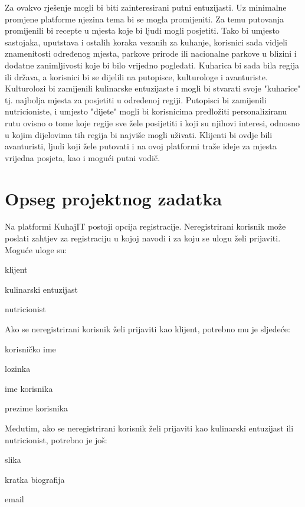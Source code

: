 		Za ovakvo rješenje mogli bi biti zainteresirani putni entuzijasti. Uz minimalne promjene platforme njezina tema bi se mogla promijeniti. Za temu putovanja promijenili bi recepte u mjesta koje bi ljudi mogli posjetiti. Tako bi umjesto sastojaka, uputstava i ostalih koraka vezanih za kuhanje, korisnici sada vidjeli znamenitosti određenog mjesta, parkove prirode ili nacionalne parkove u blizini i dodatne zanimljivosti koje bi bilo vrijedno pogledati. Kuharica bi sada bila regija ili država, a korisnici bi se dijelili na putopisce, kulturologe i avanturiste. Kulturolozi bi zamijenili kulinarske entuzijaste i mogli bi stvarati svoje "kuharice" tj. najbolja mjesta za posjetiti u određenoj regiji. Putopisci bi zamijenili nutricioniste, i umjesto "dijete" mogli bi korisnicima predložiti personaliziranu rutu ovisno o tome koje regije sve žele posijetiti i koji su njihovi interesi, odnosno u kojim dijelovima tih regija bi najviše mogli uživati. Klijenti bi ovdje bili avanturisti, ljudi koji žele putovati i na ovoj platformi traže ideje za mjesta vrijedna posjeta, kao i mogući putni vodič.
		
		\section{Opseg projektnog zadatka}
		Na platformi KuhajIT postoji opcija registracije.
		Neregistrirani korisnik može poslati zahtjev za registraciju u kojoj navodi i za koju se ulogu želi prijaviti. Moguće uloge su:
		\begin{packed_item}
		    \item klijent
		    \item kulinarski entuzijast
		    \item nutricionist
		\end{packed_item}
		
		Ako se neregistrirani korisnik želi prijaviti kao klijent, potrebno mu je sljedeće:
		\begin{packed_item}
			\item korisničko ime
			\item lozinka
			\item ime korisnika
			\item prezime korisnika
		\end{packed_item}
		
		Međutim, ako se neregistrirani korisnik želi prijaviti kao kulinarski entuzijast ili nutricionist, potrebno je još:
		\begin{packed_item}
			\item slika
			\item kratka biografija
			\item email
		\end{packed_item}
		
